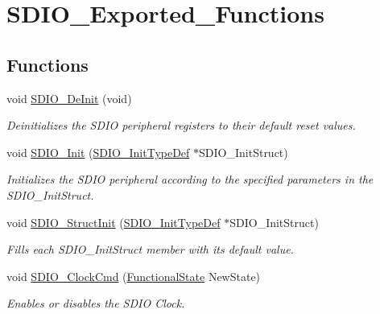 \hypertarget{group___s_d_i_o___exported___functions}{}\section{S\+D\+I\+O\+\_\+\+Exported\+\_\+\+Functions}
\label{group___s_d_i_o___exported___functions}
\subsection*{Functions}
\begin{DoxyCompactItemize}
\item 
void \mbox{\hyperlink{group___s_d_i_o___exported___functions_gac359d2c6c67a2590f8f9b720c0e4ff1b}{S\+D\+I\+O\+\_\+\+De\+Init}} (void)
\begin{DoxyCompactList}\small\item\em Deinitializes the S\+D\+IO peripheral registers to their default reset values. \end{DoxyCompactList}\item 
void \mbox{\hyperlink{group___s_d_i_o___exported___functions_gad40764a8e37c0ed5c9141ae338ff0203}{S\+D\+I\+O\+\_\+\+Init}} (\mbox{\hyperlink{struct_s_d_i_o___init_type_def}{S\+D\+I\+O\+\_\+\+Init\+Type\+Def}} $\ast$S\+D\+I\+O\+\_\+\+Init\+Struct)
\begin{DoxyCompactList}\small\item\em Initializes the S\+D\+IO peripheral according to the specified parameters in the S\+D\+I\+O\+\_\+\+Init\+Struct. \end{DoxyCompactList}\item 
void \mbox{\hyperlink{group___s_d_i_o___exported___functions_ga778d338c29df4fae9ef69432e6df32ad}{S\+D\+I\+O\+\_\+\+Struct\+Init}} (\mbox{\hyperlink{struct_s_d_i_o___init_type_def}{S\+D\+I\+O\+\_\+\+Init\+Type\+Def}} $\ast$S\+D\+I\+O\+\_\+\+Init\+Struct)
\begin{DoxyCompactList}\small\item\em Fills each S\+D\+I\+O\+\_\+\+Init\+Struct member with its default value. \end{DoxyCompactList}\item 
void \mbox{\hyperlink{group___s_d_i_o___exported___functions_ga7243b857d6b323748ff3a493b265bedc}{S\+D\+I\+O\+\_\+\+Clock\+Cmd}} (\mbox{\hyperlink{group___exported__types_gac9a7e9a35d2513ec15c3b537aaa4fba1}{Functional\+State}} New\+State)
\begin{DoxyCompactList}\small\item\em Enables or disables the S\+D\+IO Clock. \end{DoxyCompactList}\item 

\end{DoxyCompactItemize}
